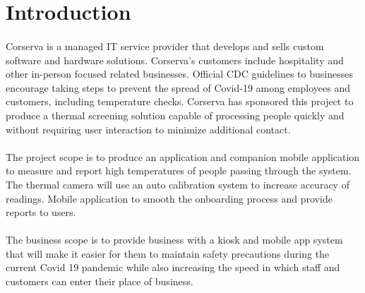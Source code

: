 \documentclass[12pt, letterpaper]{article}
\begin{document}
    
    \newpage
    \tableofcontents
    \newpage
    \listoftables
    \listoffigures
    \newpage
    \section{Introduction}
    \paragraph{}
    Corserva is a managed IT service provider that develops and sells custom software and 
    hardware solutions. Corserva's customers include hospitality and other in-person focused 
    related businesses. Official CDC guidelines to businesses encourage taking steps to prevent 
    the spread of Covid-19 among employees and customers, including temperature checks. Corserva 
    has sponsored this project to produce a thermal screening solution capable of processing 
    people quickly and without requiring user interaction to minimize additional contact.
    \paragraph{}
    The project scope is to produce an application and companion mobile application to 
    measure and report high temperatures of people passing through the system. The thermal 
    camera will use an auto calibration system to increase accuracy of readings. Mobile 
    application to smooth the onboarding process and provide reports to users.
    \paragraph{}
    The business scope is to provide business with a kiosk and mobile app
    system that will make it easier for them to maintain safety precautions during
    the current Covid 19 pandemic while also increasing the speed in which staff and customers 
    can enter their place of business.
    \newpage
\end{document}
